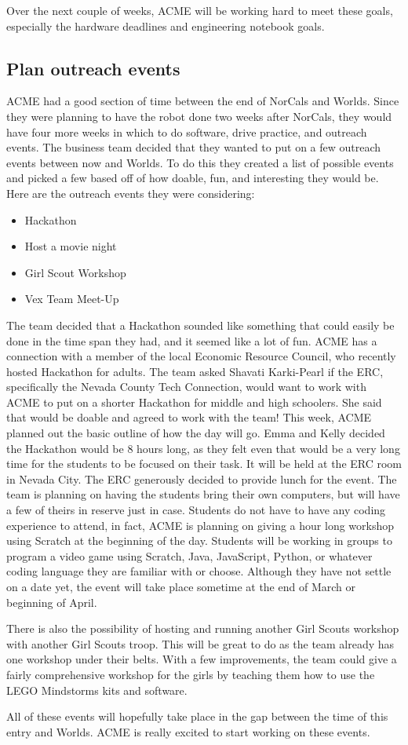 \documentclass{article}
\begin{document}
Over the next couple of weeks, ACME will be working hard to meet these goals, especially the hardware deadlines and engineering notebook goals. 

\subsection{Plan outreach events}
ACME had a good section of time between the end of NorCals and Worlds. Since they were planning to have the robot done two weeks after NorCals, they would have four more weeks in which to do software, drive practice, and outreach events. The business team decided that they wanted to put on a few outreach events between now and Worlds. To do this they created a list of possible events and picked a few based off of how doable, fun, and interesting they would be. Here are the outreach events they were considering:

\begin{itemize}
    \item Hackathon
    \item Host a movie night
    \item Girl Scout Workshop
    \item Vex Team Meet-Up
\end{itemize}

The team decided that a Hackathon sounded like something that could easily be done in the time span they had, and it seemed like a lot of fun. ACME has a connection with a member of the local Economic Resource Council, who recently hosted Hackathon for adults. The team asked Shavati Karki-Pearl if the ERC, specifically the Nevada County Tech Connection, would want to work with ACME to put on a shorter Hackathon for middle and high schoolers. She said that would be doable and agreed to work with the team! This week, ACME planned out the basic outline of how the day will go. Emma and Kelly decided the Hackathon would be 8 hours long, as they felt even that would be a very long time for the students to be focused on their task. It will be held at the ERC room in Nevada City. The ERC generously decided to provide lunch for the event. The team is planning on having the students bring their own computers, but will have a few of theirs in reserve just in case. Students do not have to have any coding experience to attend, in fact, ACME is planning on giving a hour long workshop using Scratch at the beginning of the day. Students will be working in groups to program a video game using Scratch, Java, JavaScript, Python, or whatever coding language they are familiar with or choose. Although they have not settle on a date yet, the event will take place sometime at the end of March or beginning of April. 

There is also the possibility of hosting and running another Girl Scouts workshop with another Girl Scouts troop. This will be great to do as the team already has one workshop under their belts. With a few improvements, the team could give a fairly comprehensive workshop for the girls by teaching them how to use the LEGO Mindstorms kits and software. 

All of these events will hopefully take place in the gap between the time of this entry and Worlds. ACME is really excited to start working on these events. 
\end{document}

